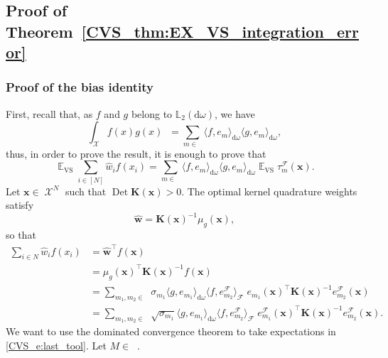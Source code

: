 \documentclass[twoside,11pt]{book}
\numberwithin{theorem}{chapter}
\numberwithin{definition}{chapter}
\numberwithin{proposition}{chapter}
\numberwithin{corollary}{chapter}
\numberwithin{example}{chapter}
\numberwithin{lemma}{chapter}
\numberwithin{assumption}{chapter}
\numberwithin{equation}{chapter}
\numberwithin{figure}{chapter}
\DeclareMathOperator{\Det}{Det}
\DeclareMathOperator{\VS}{\mathrm{VS}}
\DeclareMathOperator{\Tran}{\intercal}
\DeclareMathOperator{\EX}{\mathbb{E}}
\DeclareMathOperator{\F}{\mathcal{F}}
\DeclareMathOperator{\X}{\mathcal{X}}
\def\Ltwo{\mathbb{L}_{2}(\mathrm{d} \omega)}
\DeclareMathOperator{\Mu}{\mathrm{d}\omega(x)}
\DeclareMathOperator{\Ns}{\mathbb{N}^{*}}
\newcommand{\rb}[1]{\textcolor{magenta}{#1}}
\begin{document}
\subsection{Proof of Theorem~\ref{CVS_thm:EX_VS_integration_error}}\label{CVS_app:proof_bias}
\subsubsection{Proof of the bias identity}
First, recall that, as $f$ and $g$ belong to $\Ltwo$, we have
\begin{equation}
\int_{\X}f(x)g(x) \Mu = \sum\limits_{m \in \Ns} \langle f,e_{m}\rangle_{\mathrm{d}\omega} \langle g,e_{m}\rangle_{\mathrm{d}\omega},
\end{equation}
thus, in order to prove the result, it is enough to prove that
\begin{equation}\label{CVS_eq:EX_VS_optimal_quadrature_formula}
\EX_{\VS} \sum\limits_{i \in [N]} \widehat{w}_{i}f(x_{i}) = \sum\limits_{m \in \Ns} \langle f,e_{m} \rangle_{\mathrm{d}\omega} \langle g,e_{m} \rangle_{\mathrm{d}\omega} \EX_{\VS}\tau_{m}^{\F}(\bm{x}).
\end{equation}
Let $\bm{x} \in \X^{N}$ such that $\Det \bm{K}(\bm{x})>0$. The optimal kernel quadrature weights satisfy
\begin{equation}
\widehat{\bm{w}} = \bm{K}(\bm{x})^{-1}\mu_{g}(\bm{x}),
\end{equation}
so that
\begin{align}
\sum\limits_{i \in N} \widehat{w}_{i}f(x_{i}) & = \widehat{\bm{w}}^{\Tran} f(\bm{x}) \\
& = \mu_{g}(\bm{x})^{\Tran} \bm{K}(\bm{x})^{-1} f(\bm{x})\\
& = \sum_{m_{1},m_{2} \in \Ns} \sigma_{m_{1}} \langle g, e_{m_{1}} \rangle_{\mathrm{d}\omega} \langle f, e_{m_{2}}^{\F} \rangle_{\F} \; e_{m_{1}}(\bm{x})^{\Tran} \bm{K}(\bm{x})^{-1}e_{m_{2}}^{\F}(\bm{x}) \\
& = \sum\limits_{m_{1},m_{2} \in \Ns} \sqrt{\sigma_{m_{1}}} \langle g, e_{m_{1}} \rangle_{\mathrm{d}\omega}  \langle f, e_{m_{2}}^{\F} \rangle_{\F}\;  e_{m_{1}}^{\F}(\bm{x})^{\Tran} \bm{K}(\bm{x})^{-1}e_{m_{2}}^{\F}(\bm{x}).
\label{CVS_e:last_tool}
\end{align}
We want to use the dominated convergence theorem to take expectations in \eqref{CVS_e:last_tool}.
Let $M \in \Ns$.
\end{document}
